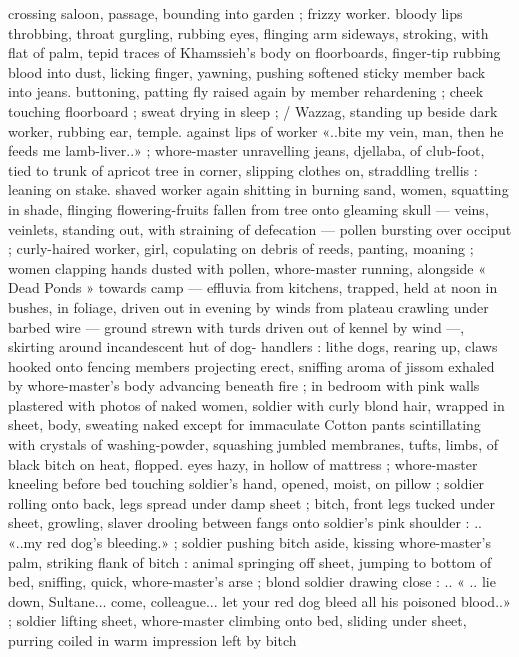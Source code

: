 crossing saloon, passage, bounding into garden ; frizzy worker.
bloody lips throbbing, throat gurgling, rubbing eyes, flinging arm
sideways, stroking, with flat of palm, tepid traces of Khamssieh’s
body on floorboards, finger-tip rubbing blood into dust, licking
finger, yawning, pushing softened sticky member back into jeans.
buttoning, patting fly raised again by member rehardening ; cheek
touching floorboard ; sweat drying in sleep ; / Wazzag, standing up
beside dark worker, rubbing ear, temple. against lips of worker
«..bite my vein, man, then he feeds me lamb-liver..» ; whore-master
unravelling jeans, djellaba, of club-foot, tied to trunk of apricot tree
in corner, slipping clothes on, straddling trellis : leaning on stake.
shaved worker again shitting in burning sand, women, squatting in
shade, flinging flowering-fruits fallen from tree onto gleaming skull
--- veins, veinlets, standing out, with straining of defecation ---
pollen bursting over occiput ; curly-haired worker, girl, copulating on
debris of reeds, panting, moaning ; women clapping hands dusted
with pollen, whore-master running, alongside « Dead Ponds »
towards camp --- effluvia from kitchens, trapped, held at noon in
bushes, in foliage, driven out in evening by winds from plateau
crawling under barbed wire --- ground strewn with turds driven out
of kennel by wind ---, skirting around incandescent hut of dog-
handlers : lithe dogs, rearing up, claws hooked onto fencing
members projecting erect, sniffing aroma of jissom exhaled by
whore-master's body advancing beneath fire ; in bedroom with pink
walls plastered with photos of naked women, soldier with curly blond
hair, wrapped in sheet, body, sweating naked except for immaculate
Cotton pants scintillating with crystals of washing-powder, squashing
jumbled membranes, tufts, limbs, of black bitch on heat, flopped.
eyes hazy, in hollow of mattress ; whore-master kneeling before bed
touching soldier's hand, opened, moist, on pillow ; soldier rolling
onto back, legs spread under damp sheet ; bitch, front legs tucked
under sheet, growling, slaver drooling between fangs onto soldier's
pink shoulder : .. «..my red dog's bleeding.» ; soldier pushing bitch
aside, kissing whore-master's palm, striking flank of bitch : animal
springing off sheet, jumping to bottom of bed, sniffing, quick,
whore-master's arse ; blond soldier drawing close : .. « .. lie down,
Sultane... come, colleague... let your red dog bleed all his poisoned
blood..» ; soldier lifting sheet, whore-master climbing onto bed,
sliding under sheet, purring coiled in warm impression left by bitch
